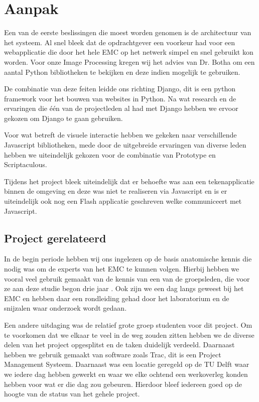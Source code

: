 \section{Aanpak}
\label{Aanpak}
Een van de eerste beslissingen die moest worden genomen is de architectuur van het systeem. Al snel bleek dat de opdrachtgever een voorkeur had voor een webapplicatie die door het hele EMC op het netwerk simpel en snel gebruikt kon worden. 
Voor onze Image Processing kregen wij het advies van Dr. Botha om een aantal Python bibliotheken te bekijken en deze indien mogelijk te gebruiken. 

De combinatie van deze feiten leidde ons richting Django, dit is een python framework voor het bouwen van websites in Python. Na wat research en de ervaringen die \'{e}\'{e}n van de projectleden al had met Django hebben we ervoor gekozen om Django te gaan gebruiken. 

Voor wat betreft de visuele interactie hebben we gekeken naar verschillende Javascript bibliotheken, mede door de uitgebreide ervaringen van diverse leden hebben we uiteindelijk gekozen voor de combinatie van Prototype en Scriptaculous.

Tijdens het project bleek uiteindelijk dat er behoefte was aan een tekenapplicatie binnen de omgeving en deze was niet te realiseren via Javascript en is er uiteindelijk ook nog een Flash applicatie geschreven welke communiceert met Javascript.

\subsection{Project gerelateerd}
In de begin periode hebben wij ons ingelezen op de basis anatomische kennis die nodig was om de experts van het EMC te kunnen volgen. Hierbij hebben we vooral veel gebruik gemaakt van de kennis van een van de groepsleden, die voor ze aan deze studie begon drie jaar . Ook zijn we een dag langs geweest bij het EMC en hebben daar een rondleiding gehad door het laboratorium en de snijzalen waar onderzoek wordt gedaan. 

Een andere uitdaging was de relatief grote groep studenten voor dit project. Om te voorkomen dat we elkaar te veel in de weg zouden zitten hebben we de diverse delen van het project opgesplitst en de taken duidelijk verdeeld. Daarnaast hebben we gebruik gemaakt van software zoals Trac, dit is een Project Management Systeem. Daarnaast was een locatie geregeld op de TU Delft waar we iedere dag hebben gewerkt en waar we elke ochtend een werkoverleg konden hebben voor wat er die dag zou gebeuren. Hierdoor bleef iedereen goed op de hoogte van de status van het gehele project.
